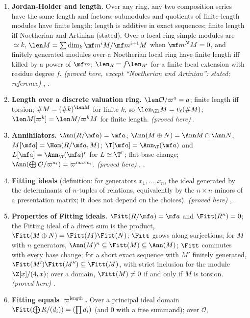 \begin{enumerate}[label=\textbf{\thechapter.\arabic*}]
.
\item \label{card:modules:jh}\textbf{Jordan-Holder and length.} Over any ring, any two composition series have the same length and factors; submodules and quotients of
finite-length modules have finite length; length is additive in exact sequences; finite length iff Noetherian and Artinian (stated). Over a local ring simple
modules are $\simeq k$, $\len M=\sum\dim_k\mf m^iM/\mf m^{i+1}M$ when $\mf m^NM=0$, and finitely generated modules over a Noetherian local ring have finite length iff killed by a
power of $\mf m$; $\len_R=f\len_{R'}$ for a finite local extension with residue degree $f$. \emph{(proved here, except ``Noetherian and Artinian'': stated; reference)}
, .
\item \textbf{Length over a discrete valuation ring.} $\len\mathcal O/\varpi^a=a$; finite length iff torsion; $\#M=(\#k)^{\len M}$ for finite $k$, so $\len_{\Zl}M=v_\ell(\#M)$;
$\len M[\varpi^k]=\len M/\varpi^kM$ for finite length. \emph{(proved here)} .
\item \textbf{Annihilators.} $\Ann(R/\mf a)=\mf a$; $\Ann(M\oplus N)=\Ann M\cap\Ann N$; $M[\mf a]=\Hom(R/\mf a,M)$; $\T[\mf a]=\Ann_\T(\mf a)$ and $L[\mf a]=\Ann_\T(\mf a)^r$ for $L\simeq\T^r$; flat base
change; $\Ann(\bigoplus\mathcal O/\varpi^{a_i})=\varpi^{\max a_i}$. \emph{(proved here)} , .
\item \textbf{Fitting ideals} (definition: for generators $x_1,\dots,x_n$, the ideal generated by the determinants of $n$-tuples of relations, equivalently by the $n\times n$
minors of a presentation matrix; it does not depend on the choices). \emph{(proved here)} , .
\item \textbf{Properties of Fitting ideals.} $\Fitt(R/\mf a)=\mf a$ and $\Fitt(R^n)=0$; the Fitting ideal of a direct sum is the product, $\Fitt(M\oplus N)=\Fitt(M)\Fitt(N)$; $\Fitt$ grows along surjections; for $M$ with $n$
generators, $\Ann(M)^n\subseteq\Fitt(M)\subseteq\Ann(M)$;
$\Fitt$ commutes with every base change; for a short exact sequence with $M'$ finitely generated, $\Fitt(M')\Fitt(M'')\subseteq\Fitt(M)$, with strict inclusion for the module $\Z[x]/(4,x)$; over a domain,
$\Fitt(M)\ne0$ if and only if $M$ is torsion.
\emph{(proved here)} .
\item \textbf{Fitting equals $\varpi^{\mathrm{length}}$.} Over a principal ideal domain $\Fitt(\bigoplus R/(d_i))=(\prod d_i)$ (and $0$ with a free summand); over $\mathcal O$,

\end{enumerate}
